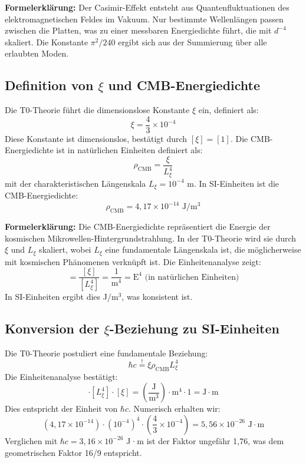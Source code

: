 \documentclass[12pt,a4paper]{article}
\begin{document}
	\textbf{Formelerklärung:} Der Casimir-Effekt entsteht aus Quantenfluktuationen des elektromagnetischen Feldes im Vakuum. Nur bestimmte Wellenlängen passen zwischen die Platten, was zu einer messbaren Energiedichte führt, die mit $d^{-4}$ skaliert. Die Konstante $\pi^2/240$ ergibt sich aus der Summierung über alle erlaubten Moden.
	
	\subsection{Definition von $\xi$ und CMB-Energiedichte}
	Die T0-Theorie führt die dimensionslose Konstante $\xi$ ein, definiert als:
	\begin{equation}
		\xi = \frac{4}{3} \times 10^{-4}
	\end{equation}
	Diese Konstante ist dimensionslos, bestätigt durch $[\xi] = [1]$. Die CMB-Energiedichte ist in natürlichen Einheiten definiert als:
	\begin{equation}
		\rho_{\text{CMB}} = \frac{\xi}{L_\xi^4}
	\end{equation}
	mit der charakteristischen Längenskala $L_\xi = 10^{-4}$ m. In SI-Einheiten ist die CMB-Energiedichte:
	\begin{equation}
		\rho_{\text{CMB}} = 4,17 \times 10^{-14} \text{ J}/\text{m}^3
	\end{equation}
	
	\textbf{Formelerklärung:} Die CMB-Energiedichte repräsentiert die Energie der kosmischen Mikrowellen-Hintergrundstrahlung. In der T0-Theorie wird sie durch $\xi$ und $L_\xi$ skaliert, wobei $L_\xi$ eine fundamentale Längenskala ist, die möglicherweise mit kosmischen Phänomenen verknüpft ist. Die Einheitenanalyse zeigt:
	\begin{equation}
		[\rho_{\text{CMB}}] = \frac{[\xi]}{[L_\xi^4]} = \frac{1}{\text{m}^4} = \text{E}^4 \text{ (in natürlichen Einheiten)}
	\end{equation}
	In SI-Einheiten ergibt dies J/m$^3$, was konsistent ist.
	
	\subsection{Konversion der $\xi$-Beziehung zu SI-Einheiten}
	Die T0-Theorie postuliert eine fundamentale Beziehung:
	\begin{equation}
		\hbar c \stackrel{!}{=} \xi \rho_{\text{CMB}} L_\xi^4
	\end{equation}
	Die Einheitenanalyse bestätigt:
	\begin{equation}
		[\rho_{\text{CMB}}] \cdot [L_\xi^4] \cdot [\xi] = \left( \frac{\text{J}}{\text{m}^3} \right) \cdot \text{m}^4 \cdot 1 = \text{J} \cdot \text{m}
	\end{equation}
	Dies entspricht der Einheit von $\hbar c$. Numerisch erhalten wir:
	\begin{equation}
		\left( 4,17 \times 10^{-14} \right) \cdot \left( 10^{-4} \right)^4 \cdot \left( \frac{4}{3} \times 10^{-4} \right) = 5,56 \times 10^{-26} \text{ J} \cdot \text{m}
	\end{equation}
	Verglichen mit $\hbar c = 3,16 \times 10^{-26}$ J·m ist der Faktor ungefähr 1,76, was dem geometrischen Faktor 16/9 entspricht.
	
\end{document}
